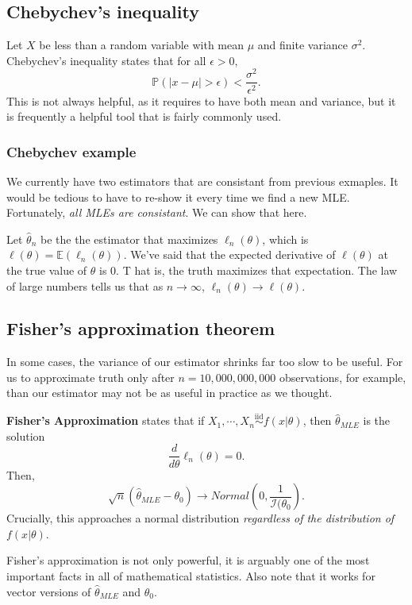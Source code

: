 \documentclass[titlepage, 12pt, leqno]{article}
\begin{document}
\subsection{Chebychev's inequality}
Let $X$ be less than a random variable with mean $\mu$ and finite variance
$\sigma^{2}$. Chebychev's inequality states that for all $\epsilon>0$,
\[
\mathbb{P}(|x-\mu| > \epsilon) < \frac{\sigma^{2}}{\epsilon^{2}}.
\]
This is not always helpful, as it requires to have both mean and variance, but
it is frequently a helpful tool that is fairly commonly used.

\subsubsection{Chebychev example}
We currently have two estimators that are consistant from previous exmaples. It
would be tedious to have to re-show it every time we find a new MLE. Fortunately,
\textit{all MLEs are consistant}. We can show that here.

Let $\hat \theta_{n}$ be the the estimator that maximizes $\ell_{n}(\theta)$,
which is $\ell(\theta) = \mathbb{E}(\ell_{n}(\theta))$. We've said that the 
expected derivative of $\ell(\theta)$ at the true value of $\theta$ is 0. T
hat is, the truth maximizes that expectation. The law of large numbers tells us
that as $n \rightarrow \infty$, $\ell_{n}(\theta) \rightarrow \ell(\theta)$.

\subsection{Fisher's approximation theorem}
In some cases, the variance of our estimator shrinks far too slow to be useful.
For us to approximate truth only after $n = 10,000,000,000$ observations, for
example, than our estimator may not be as useful in practice as we thought.
\begin{definition}
    \textbf{Fisher's Approximation} states that if $X_{1}, \cdots , X_{n}
    \overset{\mathrm{iid}}{\sim}f(x|\theta)$, then $\hat \theta_{MLE}$ is the
    solution
    \[
    \frac{d}{d \theta}\ell_{n}(\theta) = 0.
    \]
    Then, 
    \[
    \sqrt{n}(\hat \theta_{MLE} - \theta_{0}) \rightarrow Normal\left(0, 
        \frac{1}{\mathcal{I}(\theta_{0}}\right).
    \]
    Crucially, this approaches a normal distribution \textit{regardless of the
    distribution of} $f(x|\theta)$.
\end{definition}

Fisher's approximation is not only powerful, it is arguably one of the most
important facts in all of mathematical statistics. Also note that it works for
vector versions of $\hat \theta_{MLE}$ and $\theta_{0}$.
\end{document}

